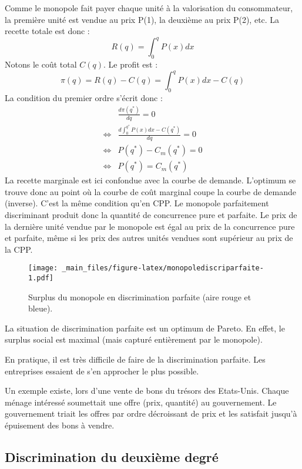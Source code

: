 \documentclass[
]{book}
\theoremstyle{definition}
\theoremstyle{definition}
\theoremstyle{definition}
\theoremstyle{definition}
\theoremstyle{remark}
\begin{document}
Comme le monopole fait payer chaque unité à la valorisation du consommateur, la première unité est vendue au prix P(1), la deuxième au prix P(2), etc.
La recette totale est donc :
\[
R(q) = \int_0^q P(x) dx
\]
Notons le coût total \(C(q)\).
Le profit est :
\[
\pi(q) = R(q) - C(q) = \int_0^q P(x) dx -C(q)
\]
La condition du premier ordre s'écrit donc :
\[
\begin{array}{rl}
&\frac{d\pi(q^*)}{dq} = 0\\
\Leftrightarrow & \frac{d\int_0^{q^*} P(x) dx -C(q^*)}{dq} = 0\\
\Leftrightarrow & P(q^*) - C_m(q^*) = 0\\
\Leftrightarrow & P(q^*) = C_m(q^*)
\end{array}
\]
La recette marginale est ici confondue avec la courbe de demande.
L'optimum se trouve donc au point où la courbe de coût marginal coupe la courbe de demande (inverse).
C'est la même condition qu'en CPP.
Le monopole parfaitement discriminant produit donc la quantité de concurrence pure et parfaite.
Le prix de la dernière unité vendue par le monopole est égal au prix de la concurrence pure et parfaite, même si les prix des autres unités vendues sont supérieur au prix de la CPP.

\begin{figure}
\centering
\texttt{[image: \_main\_files/figure-latex/monopolediscriparfaite-1.pdf]}
\caption{\label{fig:monopolediscriparfaite}Surplus du monopole en discrimination parfaite (aire rouge et bleue).}
\end{figure}

La situation de discrimination parfaite est un optimum de Pareto.
En effet, le surplus social est maximal (mais capturé entièrement par le monopole).

En pratique, il est très difficile de faire de la discrimination parfaite.
Les entreprises essaient de s'en approcher le plus possible.

Un exemple existe, lors d'une vente de bons du trésors des Etats-Unis.
Chaque ménage intéressé soumettait une offre (prix, quantité) au gouvernement.
Le gouvernement triait les offres par ordre décroissant de prix et les satisfait jusqu'à épuisement des bons à vendre.

\hypertarget{discrimination-du-deuxiuxe8me-degruxe9}{%
\subsection{Discrimination du deuxième degré}\label{discrimination-du-deuxiuxe8me-degruxe9}}
\end{document}
